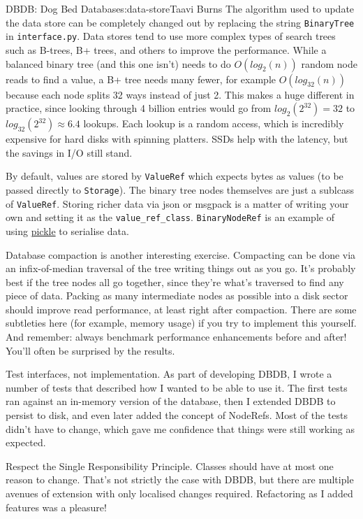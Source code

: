 \begin{aosachapter}{DBDB: Dog Bed Database}{s:data-store}{Taavi Burns}
The algorithm used to update the data store can be completely changed
out by replacing the string \texttt{BinaryTree} in
\texttt{interface.py}. Data stores tend to use more complex types of
search trees such as B-trees, B+ trees, and others to improve the
performance. While a balanced binary tree (and this one isn't) needs to
do $O(log_2(n))$ random node reads to find a value, a B+ tree needs many
fewer, for example $O(log_{32}(n))$ because each node splits 32 ways
instead of just 2. This makes a huge different in practice, since
looking through 4 billion entries would go from $log_2(2^{32}) = 32$ to
$log_{32}(2^{32}) \approx 6.4$ lookups. Each lookup is a random access,
which is incredibly expensive for hard disks with spinning platters.
SSDs help with the latency, but the savings in I/O still stand.

By default, values are stored by \texttt{ValueRef} which expects bytes
as values (to be passed directly to \texttt{Storage}). The binary tree
nodes themselves are just a sublcass of \texttt{ValueRef}. Storing
richer data via json or msgpack is a matter of writing your own and
setting it as the \texttt{value\_ref\_class}. \texttt{BinaryNodeRef} is
an example of using
\href{https://docs.python.org/3.4/library/pickle.html}{pickle} to
serialise data.

Database compaction is another interesting exercise. Compacting can be
done via an infix-of-median traversal of the tree writing things out as
you go. It's probably best if the tree nodes all go together, since
they're what's traversed to find any piece of data. Packing as many
intermediate nodes as possible into a disk sector should improve read
performance, at least right after compaction. There are some subtleties
here (for example, memory usage) if you try to implement this yourself.
And remember: always benchmark performance enhancements before and
after! You'll often be surprised by the results.

\label{patterns-and-principles}

Test interfaces, not implementation. As part of developing DBDB, I wrote
a number of tests that described how I wanted to be able to use it. The
first tests ran against an in-memory version of the database, then I
extended DBDB to persist to disk, and even later added the concept of
NodeRefs. Most of the tests didn't have to change, which gave me
confidence that things were still working as expected.

Respect the Single Responsibility Principle. Classes should have at most
one reason to change. That's not strictly the case with DBDB, but there
are multiple avenues of extension with only localised changes required.
Refactoring as I added features was a pleasure!


\end{aosachapter}
